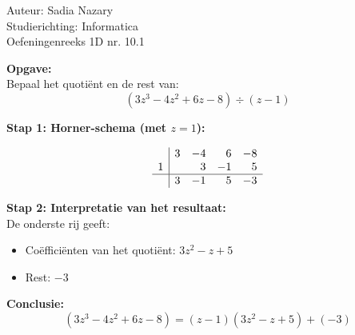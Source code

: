 \documentclass[a4paper]{article}
\begin{document}
\noindent \large Auteur: Sadia Nazary \\
\noindent \large Studierichting: Informatica \\
\noindent \large Oefeningenreeks 1D nr. 10.1 \\

\medskip

\normalsize

\textbf{Opgave:} \\

Bepaal het quotiënt en de rest van: \\

\[
(3z^3 - 4z^2 + 6z - 8) \div (z - 1)
\]

\textbf{Stap 1: Horner-schema (met $z = 1$):}

\[
\begin{array}{r|rrrr}
 & 3 & -4 & 6 & -8 \\
1 &   & 3 & -1 & 5 \\ \hline
 & 3 & -1 & 5 & -3
\end{array}
\]

\textbf{Stap 2: Interpretatie van het resultaat:}\\

De onderste rij geeft:

\begin{itemize}
  \item Coëfficiënten van het quotiënt: $3z^2 - z + 5$
  \item Rest: $-3$
\end{itemize}

\textbf{Conclusie:}
\[
\boxed{
(3z^3 - 4z^2 + 6z - 8) = (z - 1)(3z^2 - z + 5) + (-3)
}
\]
\end{document}
